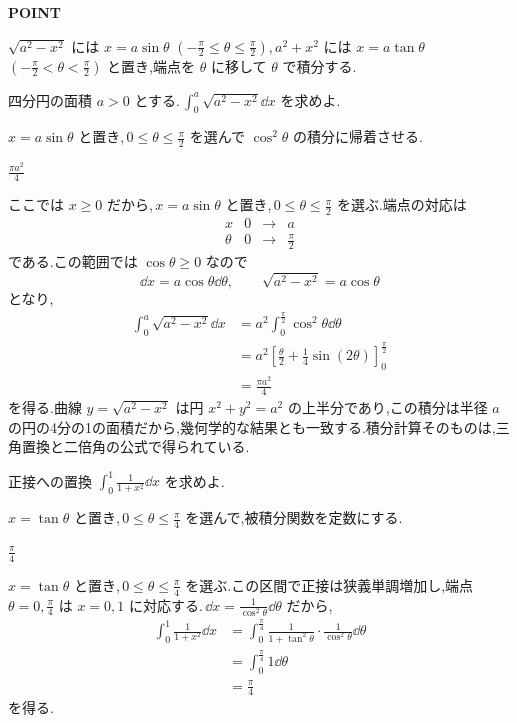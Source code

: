 \begin{bookpoint}
\textbf{POINT}\par
$\sqrt{a^2-x^2}$ には $x=a\sin\theta$ $\left(-\frac\pi2\le\theta\le\frac\pi2\right)$,\,$a^2+x^2$ には $x=a\tan\theta$ $\left(-\frac\pi2<\theta<\frac\pi2\right)$ と置き,端点を $\theta$ に移して $\theta$ で積分する.
\end{bookpoint}

\begin{example}{四分円の面積}
$a>0$ とする.\,$\int_0^a\sqrt{a^2-x^2}\dd x$ を求めよ.
\end{example}

$x=a\sin\theta$ と置き,\,$0\le\theta\le\frac\pi2$ を選んで $\cos^2\theta$ の積分に帰着させる.

$\frac{\pi a^2}{4}$

ここでは $x\ge0$ だから,\,$x=a\sin\theta$ と置き,\,$0\le\theta\le\frac\pi2$ を選ぶ.端点の対応は
\[
 \begin{array}{c|ccc}
 x&0&\to&a\\ \hline
 \theta&0&\to&\frac\pi2
 \end{array}
\]
である.この範囲では $\cos\theta\ge0$ なので
\[
 \dd x=a\cos\theta\dd\theta,\qquad
 \sqrt{a^2-x^2}=a\cos\theta
\]
となり,
\begin{align*}
 \int_0^a\sqrt{a^2-x^2}\dd x
 &=a^2\int_0^{\frac\pi2}\cos^2\theta\dd\theta\\
 &=a^2\left[\frac\theta2+\frac14\sin(2\theta)\right]_0^{\frac\pi2}\\
 &=\frac{\pi a^2}{4}
\end{align*}
を得る.曲線 $y=\sqrt{a^2-x^2}$ は円 $x^2+y^2=a^2$ の上半分であり,この積分は半径 $a$ の円の4分の1の面積だから,幾何学的な結果とも一致する.積分計算そのものは,三角置換と二倍角の公式で得られている.

\begin{example}{正接への置換}
$\int_0^1\frac1{1+x^2}\dd x$ を求めよ.
\end{example}

$x=\tan\theta$ と置き,\,$0\le\theta\le\frac\pi4$ を選んで,被積分関数を定数にする.

$\frac\pi4$

$x=\tan\theta$ と置き,\,$0\le\theta\le\frac\pi4$ を選ぶ.この区間で正接は狭義単調増加し,端点 $\theta=0,\frac\pi4$ は $x=0,1$ に対応する.\,$\dd x=\frac1{\cos^2\theta}\dd\theta$ だから,
\begin{align*}
 \int_0^1\frac1{1+x^2}\dd x
 &=\int_0^{\frac\pi4}
   \frac1{1+\tan^2\theta}\cdot
   \frac1{\cos^2\theta}\dd\theta\\
 &=\int_0^{\frac\pi4}1\dd\theta\\
 &=\frac\pi4
\end{align*}
を得る.


